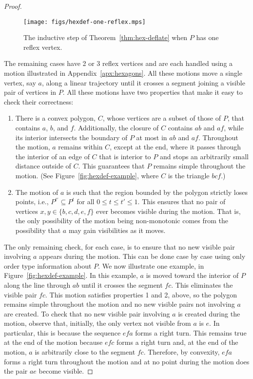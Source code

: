 \documentclass[11pt]{amsart}
\begin{document}
\begin{proof}
  \begin{figure}[htb]
    \centering
    \texttt{[image: figs/hexdef-one-reflex.mps]}
    \caption{The inductive step of Theorem~\ref{thm:hex-deflate} when $P$ has
      one reflex vertex.}
    \label{fig:hexdef-one-reflex}
  \end{figure}

  The remaining cases have 2 or 3 reflex vertices and are each handled
  using a motion illustrated in Appendix~\ref{apx:hexagons}.  All
  these motions move a single vertex, say $a$, along a linear
  trajectory until it crosses a segment joining a visible pair of
  vertices in $P$.  All these motions have two properties that make it
  easy to check their correctness:

  \begin{enumerate}
  \item There is a convex polygon, $C$, whose vertices are a subset of
    those of $P$, that contains $a$, $b$, and $f$.  Additionally, the
    closure of $C$ contains $ab$ and $af$, while its interior
    intersects the boundary of $P$ at most in $ab$ and $af$.
    Throughout the motion, $a$ remains within $C$, except at the end,
    where it passes through the interior of an edge of $C$ that is
    interior to $P$ and stops an arbitrarily small distance outside of
    $C$. This guarantees that $P$ remains simple throughout the
    motion.  (See Figure~\ref{fig:hexdef-example}, where $C$ is the
    triangle $bcf$.)
  
  \item
    The motion of $a$ is such that the region bounded by the polygon
    strictly loses points, i.e., $P^{t'} \subseteq P^t$ for all $0\le
    t\le t'\le 1$.  This ensures that no pair of vertices
    $x,y\in\{b,c,d,e,f\}$ ever becomes visible during the motion.
    That is, the only possibility of the motion being non-monotonic
    comes from the possibility that $a$ may gain visibilities as it
    moves.
  \end{enumerate}

  The only remaining check, for each case, is to ensure that no new
  visible pair involving $a$ appears during the motion. This can be
  done case by case using only order type information about $P$.  We
  now illustrate one example, in Figure~\ref{fig:hexdef-example}.  In
  this example, $a$ is moved toward the interior of $P$ along the line
  through $ab$ until it crosses the segment $fc$.  This eliminates the
  visible pair $fc$.  This motion satisfies properties 1 and 2, above,
  so the polygon remains simple throughout the motion and no new
  visible pairs not involving $a$ are created.  To check that no new
  visible pair involving $a$ is created during the motion, observe
  that, initially, the only vertex not visible from $a$ is $e$.  In
  particular, this is because the sequence $efa$ forms a right turn.
  This remains true at the end of the motion because $efc$ forms a
  right turn and, at the end of the motion, $a$ is arbitrarily close
  to the segment $fc$.  Therefore, by convexity, $efa$ forms a right
  turn throughout the motion and at no point during the motion does
  the pair $ae$ become visible.


\end{proof}
\end{document}
